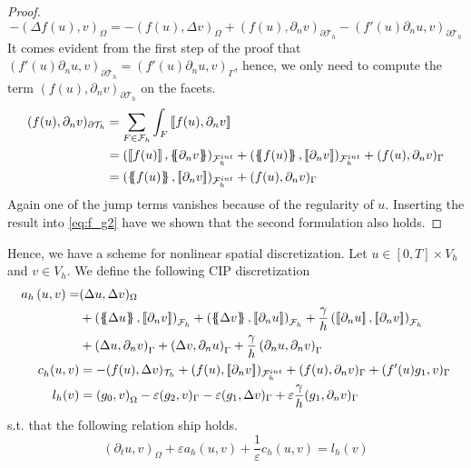 \begin{proof}
\begin{equation}
\label{eq:f_g2}
-(\Delta f( u) , v)_{\Omega  }  = -( f( u), \Delta v )_{\Omega } + (f( u), \partial _{n} v  )_{\partial \mathcal{T}_{h} } - (   f'( u)\partial _{n}u, v )_{\partial \mathcal{T}_{h}  }
\end{equation}
It comes evident from the first step of the proof that $ (   f'( u)\partial _{n}u, v )_{\partial \mathcal{T}_{h}  } = (   f'( u)\partial _{n}u, v )_{\Gamma }$, hence, we only need to compute the term $(f( u), \partial _{n} v  )_{\partial
\mathcal{T}_{h} }$ on the facets. \[
    \begin{split}
(f( u), \partial _{n} v  )_{\partial
\mathcal{T}_{h} } & = \sum_{F\in \mathcal{F} _{h}}^{} \int_{F}^{}\jump{ f( u), \partial _{n} v  } \\
& =  (\jump{ f( u)  }  , \mean{ \partial _{n} v }    )_{ \mathcal{F}_{h}^{int} } +(\mean{ f( u)  }  , \jump{ \partial _{n} v }    )_{ \mathcal{F}_{h}^{int} } + (f( u), \partial _{n} v  )_{\Gamma } \\
&=  (\mean{ f( u)  }  , \jump{ \partial _{n} v }    )_{ \mathcal{F}_{h}^{int} } + (f( u), \partial _{n} v  )_{\Gamma }
    \end{split}
\]
Again one of the jump terms vanishes because of the regularity of $u$.
Inserting the result into \eqref{eq:f_g2} have we shown that the second formulation also holds.
\end{proof}

Hence, we have a scheme for nonlinear spatial discretization. Let $u \in \left[ 0,T \right] \times V_{h}  $ and $v \in V_{h}$. We define the following CIP discretization
\begin{equation}
    \label{eq:cip_ch}
    \begin{split}
        a_{h} \left( u, v \right)   =& ( \Delta  u, \Delta v ) _{ \Omega } \\
                                     & + \left( \mean{  \Delta  u }, \jump{ \partial _{n }v} \right)_{\mathcal{F}_{h}  }  + \left( \mean{ \Delta  v }, \jump{ \partial _{n}u }      \right)_{\mathcal{F}_{h}  }  + \frac{\gamma }{h}  \left( \jump{ \partial _{n} u}, \jump{ \partial _{n} v   }   \right)_{\mathcal{F}_{h} } \\
                                     & + \left(   \Delta  u ,  \partial _{n }v \right)_{\Gamma   }  + \left(  \Delta  v ,  \partial _{n}u       \right)_{\Gamma  }  + \frac{\gamma }{h}  \left(  \partial _{n} u,  \partial _{n} v      \right)_{ \Gamma } \\
    c^{}_{h} ( u,v)  & = -( f( u), \Delta v )_{\mathcal{T} _{h}}+  ( f( u) , \jump{ \partial _{n}v }  )_{\mathcal{F} _{h}^{int}} + ( f(u), \partial _{n} v)_{\Gamma  }  + ( f'( u)  g_{1}   ,  v)_{\Gamma } \\
    l_{h}( v_{}) & =  \left( g_{0}, v \right) _{\Omega } -  \varepsilon ( g_{2},  v )_{\Gamma }  -  \varepsilon ( g_{1}, \Delta  v  )_{\Gamma }  + \varepsilon \frac{\gamma }{h} ( g_{1}, \partial _{n} v  )_{\Gamma }
    \end{split}
\end{equation}
s.t. that the following relation ship holds.
\[
    ( \partial _{t}u, v)_\Omega + \varepsilon  a_{h}( u,v) + \frac{1}{\varepsilon }c_{h}( u,v)   =  l_{h}(v)
\]

